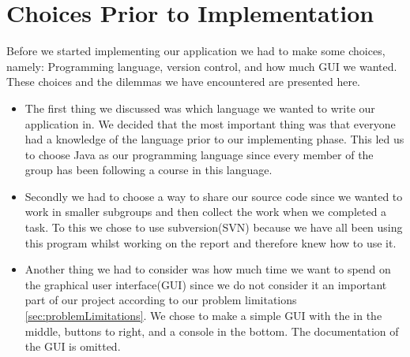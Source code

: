 \chapter{Choices Prior to Implementation}
Before we started implementing our application we had to make some choices, namely: Programming language, version control, and how much GUI we wanted.
These choices and the dilemmas we have encountered are presented here.

\begin{itemize}
	\item The first thing we discussed was which language we wanted to write our application in.
We decided that the most important thing was that everyone had a knowledge of the language prior to our implementing phase.
This led us to choose Java as our programming language since every member of the group has been following a course in this language.

	\item Secondly we had to choose a way to share our source code since we wanted to work in smaller subgroups and then collect the work when we completed a task.
To this we chose to use subversion(SVN) because we have all been using this program whilst working on the report and therefore knew how to use it.

	\item Another thing we had to consider was how much time we want to spend on the graphical user interface(GUI) since we do not consider it an important part of our project according to our problem limitations \ref{sec:problemLimitations}.
We chose to make a simple GUI with the \rubik{} in the middle, buttons to right, and a console in the bottom.
The documentation of the GUI is omitted.
\end{itemize}
